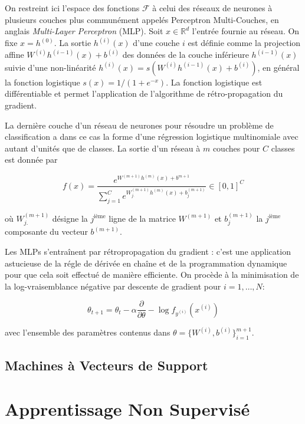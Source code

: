 On restreint ici l'espace des fonctions $\mathcal{F}$ à celui des réseaux de
neurones à plusieurs couches plus communément appelés Perceptron Multi-Couches,
en anglais \textit{Multi-Layer Perceptron} (MLP)\citep{Rosenblatt-1958}. Soit
$x\in\mathbb{R}^d$ l'entrée fournie au réseau. On fixe $x=h^{(0)}$. La sortie
$h^{(i)}(x)$ d'une couche $i$ est définie comme la projection affine
$W^{(i)}h^{(i-1)}(x) + b^{(i)}$ des données de la couche inférieure $h^{(i-1)}(x)$
suivie d'une non-linéarité $h^{(i)}(x)= s(W^{(i)}h^{(i-1)}(x) + b^{(i)})$, en
général la fonction logistique $s(x)=1/(1+e^{-x})$. La fonction logistique est différentiable et
permet l'application de l'algorithme de rétro-propagation du gradient. 

La dernière couche d'un réseau de neurones pour résoudre un problème de
classification a dans ce cas la forme d'une régression logistique multinomiale
avec autant d'unités que de classes. La sortie d'un réseau à $m$ couches pour
$C$ classes est donnée par

\begin{equation}
f(x) = \frac{e^{W^{(m+1)} h^{(m)}(x) + b^{m+1}}}{\sum_{j=1}^C e^{W^{(m+1)}_{j.} h^{(m)}(x) + b^{(m+1)}_{j} }} \in [0,1]^{C}
\end{equation}

où $W_{j.}^{(m+1)}$ désigne la $j^\textrm{ième}$ ligne de la matrice $W^{(m+1)}$
et $b_{j}^{(m+1)}$ la $j^\textrm{ième}$ composante du vecteur $b^{(m+1)}$.

Les MLPs s'entraînent par rétropropagation du gradient \citep{Rumelhart86b}:
c'est une application astucieuse de la régle de dérivée en chaîne et de la
programmation dynamique pour que cela soit effectué de manière efficiente. On
procède à la minimisation de la log-vraisemblance négative par descente de
gradient pour $i=1,\dots,N$:

\begin{equation}
\theta_{t+1} = \theta_{t} - \alpha \dfrac{\partial}{\partial\theta} -\log f_{y^{(i)}}(x^{(i)})
\end{equation}

avec l'ensemble des paramètres contenus dans $\theta=\lbrace W^{(i)},b^{(i)}\rbrace_{i=1}^{m+1}$.

\subsection{Machines à Vecteurs de Support}



\section{Apprentissage Non Supervisé}

